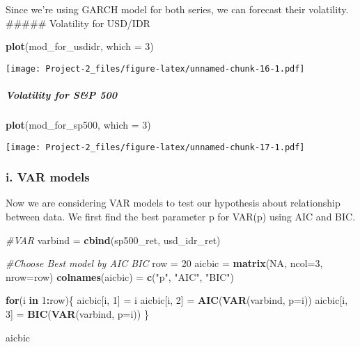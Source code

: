 \documentclass[]{article}
\newenvironment{Shaded}{\begin{snugshade}}{\end{snugshade}}
\newcommand{\KeywordTok}[1]{\textcolor[rgb]{0.13,0.29,0.53}{\textbf{#1}}}
\newcommand{\DataTypeTok}[1]{\textcolor[rgb]{0.13,0.29,0.53}{#1}}
\newcommand{\DecValTok}[1]{\textcolor[rgb]{0.00,0.00,0.81}{#1}}
\newcommand{\StringTok}[1]{\textcolor[rgb]{0.31,0.60,0.02}{#1}}
\newcommand{\CommentTok}[1]{\textcolor[rgb]{0.56,0.35,0.01}{\textit{#1}}}
\newcommand{\OtherTok}[1]{\textcolor[rgb]{0.56,0.35,0.01}{#1}}
\newcommand{\ControlFlowTok}[1]{\textcolor[rgb]{0.13,0.29,0.53}{\textbf{#1}}}
\newcommand{\OperatorTok}[1]{\textcolor[rgb]{0.81,0.36,0.00}{\textbf{#1}}}
\newcommand{\NormalTok}[1]{#1}
\let\oldsubparagraph\subparagraph
\renewcommand{\subparagraph}[1]{\oldsubparagraph{#1}\mbox{}}
\begin{document}
Since we're using GARCH model for both series, we can forecast their
volatility. \#\#\#\#\# Volatility for USD/IDR

\begin{Shaded}
\begin{Highlighting}[]
\KeywordTok{plot}\NormalTok{(mod_for_usdidr, }\DataTypeTok{which =} \DecValTok{3}\NormalTok{)}
\end{Highlighting}
\end{Shaded}

\texttt{[image: Project-2\_files/figure-latex/unnamed-chunk-16-1.pdf]}

\subparagraph{Volatility for S\&P 500}\label{volatility-for-sp-500}

\begin{Shaded}
\begin{Highlighting}[]
\KeywordTok{plot}\NormalTok{(mod_for_sp500, }\DataTypeTok{which =} \DecValTok{3}\NormalTok{)}
\end{Highlighting}
\end{Shaded}

\texttt{[image: Project-2\_files/figure-latex/unnamed-chunk-17-1.pdf]}

\subsubsection{i. VAR models}\label{i.-var-models}

Now we are considering VAR models to test our hypothesis about
relationship between data. We first find the best parameter p for VAR(p)
using AIC and BIC.

\begin{Shaded}
\begin{Highlighting}[]
\CommentTok{#VAR}
\NormalTok{varbind =}\StringTok{ }\KeywordTok{cbind}\NormalTok{(sp500_ret, usd_idr_ret)}

\CommentTok{#Choose Best model by AIC BIC}
\NormalTok{row =}\StringTok{ }\DecValTok{20}
\NormalTok{aicbic =}\StringTok{ }\KeywordTok{matrix}\NormalTok{(}\OtherTok{NA}\NormalTok{, }\DataTypeTok{ncol=}\DecValTok{3}\NormalTok{, }\DataTypeTok{nrow=}\NormalTok{row)}
\KeywordTok{colnames}\NormalTok{(aicbic) =}\StringTok{ }\KeywordTok{c}\NormalTok{(}\StringTok{"p"}\NormalTok{, }\StringTok{"AIC"}\NormalTok{, }\StringTok{"BIC"}\NormalTok{)}

\ControlFlowTok{for}\NormalTok{(i }\ControlFlowTok{in} \DecValTok{1}\OperatorTok{:}\NormalTok{row)\{}
\NormalTok{  aicbic[i, }\DecValTok{1}\NormalTok{] =}\StringTok{ }\NormalTok{i}
\NormalTok{  aicbic[i, }\DecValTok{2}\NormalTok{] =}\StringTok{ }\KeywordTok{AIC}\NormalTok{(}\KeywordTok{VAR}\NormalTok{(varbind, }\DataTypeTok{p=}\NormalTok{i))}
\NormalTok{  aicbic[i, }\DecValTok{3}\NormalTok{] =}\StringTok{ }\KeywordTok{BIC}\NormalTok{(}\KeywordTok{VAR}\NormalTok{(varbind, }\DataTypeTok{p=}\NormalTok{i))}
\NormalTok{\}}

\NormalTok{aicbic}
\end{Highlighting}
\end{Shaded}
\end{document}
